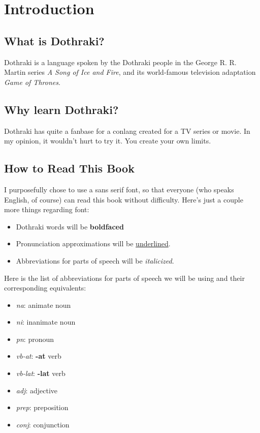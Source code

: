 \chapter*{Introduction}
\section*{What is Dothraki?}
Dothraki is a language spoken by the Dothraki people in the George R. R. Martin
series \textit{A Song of Ice and Fire}, and its world-famous television adaptation
\textit{Game of Thrones}.
\section*{Why learn Dothraki?}
Dothraki has quite a fanbase for a conlang created for a TV series or movie. In my
opinion, it wouldn't hurt to try it. You create your own limits.
\section*{How to Read This Book}
I purposefully chose to use a sans serif font, so that everyone (who speaks English,
of course) can read this book without difficulty. Here's just a couple more things regarding font:
\begin{itemize}
	\item Dothraki words will be \textbf{boldfaced}
	\item Pronunciation approximations will be \underline{underlined}.
	\item Abbreviations for parts of speech will be \textit{italicized}.
\end{itemize}
Here is the list of abbreviations for parts of speech we will be using and their corresponding equivalents:
\begin{itemize}
	\item \textit{na}: animate noun
	\item \textit{ni}: inanimate noun
	\item \textit{pn}: pronoun
	\item \textit{vb-at}: \textbf{-at} verb
  \item \textit{vb-lat}: \textbf{-lat} verb
	\item \textit{adj}: adjective
 	\item \textit{prep}: preposition
	\item \textit{conj}: conjunction
\end{itemize}
